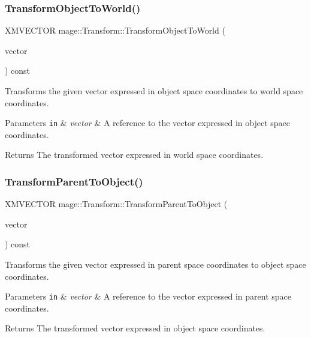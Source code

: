 \subsubsection{\texorpdfstring{Transform\+Object\+To\+World()}{TransformObjectToWorld()}}
{\footnotesize\ttfamily X\+M\+V\+E\+C\+T\+OR mage\+::\+Transform\+::\+Transform\+Object\+To\+World (\begin{DoxyParamCaption}\item[{const X\+M\+V\+E\+C\+T\+OR \&}]{vector }\end{DoxyParamCaption}) const}

Transforms the given vector expressed in object space coordinates to world space coordinates.


\begin{DoxyParams}[1]{Parameters}
\mbox{\tt in}  & {\em vector} & A reference to the vector expressed in object space coordinates. \\
\hline
\end{DoxyParams}
\begin{DoxyReturn}{Returns}
The transformed vector expressed in world space coordinates. 
\end{DoxyReturn}
\hypertarget{structmage_1_1_transform_ae218925fd8223d25d2532ac96722d8a0}{}\label{structmage_1_1_transform_ae218925fd8223d25d2532ac96722d8a0} 
\subsubsection{\texorpdfstring{Transform\+Parent\+To\+Object()}{TransformParentToObject()}}
{\footnotesize\ttfamily X\+M\+V\+E\+C\+T\+OR mage\+::\+Transform\+::\+Transform\+Parent\+To\+Object (\begin{DoxyParamCaption}\item[{const X\+M\+V\+E\+C\+T\+OR \&}]{vector }\end{DoxyParamCaption}) const}

Transforms the given vector expressed in parent space coordinates to object space coordinates.


\begin{DoxyParams}[1]{Parameters}
\mbox{\tt in}  & {\em vector} & A reference to the vector expressed in parent space coordinates. \\
\hline
\end{DoxyParams}
\begin{DoxyReturn}{Returns}
The transformed vector expressed in object space coordinates. 
\end{DoxyReturn}
\hypertarget{structmage_1_1_transform_a9c4fc1d0667d7a0a816f874d99bc82cf}{}\label{structmage_1_1_transform_a9c4fc1d0667d7a0a816f874d99bc82cf} 
